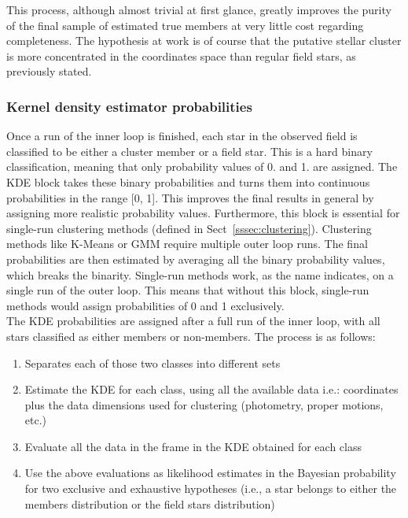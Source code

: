 \documentclass[draft]{aa}
\begin{document}
 This process, although almost trivial at first glance, greatly improves the
 purity of the final sample of estimated true members at very little cost
 regarding completeness. The hypothesis at work is of course that the putative
 stellar cluster is more concentrated in the coordinates space than regular
 field stars, as previously stated.



\subsubsection{Kernel density estimator probabilities}
 \label{sssec:kde-probs}

 Once a run of the inner loop is finished, each star in the observed field is
 classified to be either a cluster member or a field star. This is a hard
 binary classification, meaning that only probability values of 0. and 1. are
 assigned. The KDE block takes these binary probabilities and turns them into
 continuous probabilities in the range [0, 1]. This improves the final results
 in general by assigning more realistic probability values. Furthermore, this
 block is essential for single-run clustering methods (defined in
 Sect~\ref{sssec:clustering}). Clustering methods like K-Means or GMM
 require multiple outer loop runs. The final probabilities are then estimated
 by averaging all the binary probability values, which breaks the binarity.
 Single-run methods work, as the name indicates, on a single run of the outer
 loop. This means that without this block, single-run methods would assign
 probabilities of 0 and 1 exclusively.\\

 The KDE probabilities are assigned after a full run of the inner loop, with
 all stars classified as either members or non-members. The process is as
 follows:

 \begin{enumerate}
  \item Separates each of those two classes into different sets
  \item Estimate the KDE for each class, using all the available data i.e.:
  coordinates plus the data dimensions used for clustering (photometry, proper
  motions, etc.)
  \item Evaluate all the data in the frame in the KDE obtained for each class
  \item Use the above evaluations as likelihood estimates in the Bayesian
  probability for two exclusive and exhaustive hypotheses (i.e., a star
  belongs to either the members distribution or the field stars distribution)
 \end{enumerate}
\end{document}
